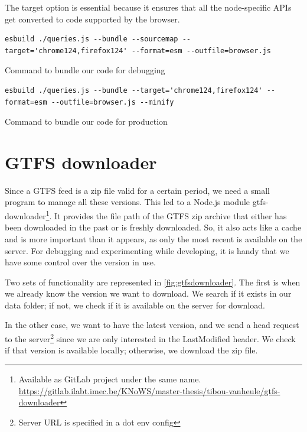 The target option is essential because it ensures that all the node-specific APIs get converted to code supported by the browser.

\begin{listing}[H]
    \begin{verbatim}
esbuild ./queries.js --bundle --sourcemap --target='chrome124,firefox124' --format=esm --outfile=browser.js
    \end{verbatim}
    \caption{Command to bundle our  code for debugging}
\end{listing}
\begin{listing}[H]
    \begin{verbatim}
esbuild ./queries.js --bundle --target='chrome124,firefox124' --format=esm --outfile=browser.js --minify
    \end{verbatim}
    \caption{Command to bundle our  code for production}
\end{listing}
\section{GTFS downloader}
Since a GTFS feed is a zip file valid for a certain period, we need a small program to manage all these versions. This led to a Node.js module gtfs-downloader\footnote{Available as GitLab project under the same name. \\\url{https://gitlab.ilabt.imec.be/KNoWS/master-thesis/tibou-vanheule/gtfs-downloader}}. It provides the file path of the GTFS zip archive that either has been downloaded in the past or is freshly downloaded. So, it also acts like a cache and is more important than it appears, as only the most recent is available on the server. For debugging and experimenting while developing, it is handy that we have some control over the version in use. 

Two sets of functionality are represented in \autoref{fig:gtfsdownloader}. The first is when we already know the version we want to download. We search if it exists in our data folder; if not, we check if it is available on the server for download.

In the other case, we want to have the latest version, and we send a head request to the server\footnote{Server URL is specified in a dot env config} since we are only interested in the LastModified header. We check if that version is available locally; otherwise, we download the zip file.

